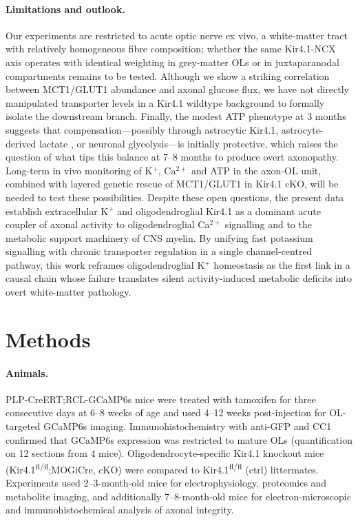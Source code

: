 \documentclass[11pt,a4paper]{article}
\begin{document}
\paragraph{Limitations and outlook.} Our experiments are restricted to acute optic nerve ex vivo, a white-matter tract with relatively homogeneous fibre composition; whether the same Kir4.1-NCX axis operates with identical weighting in grey-matter OLs or in juxtaparanodal compartments remains to be tested. Although we show a striking correlation between MCT1/GLUT1 abundance and axonal glucose flux, we have not directly manipulated transporter levels in a Kir4.1 wildtype background to formally isolate the downstream branch. Finally, the modest ATP phenotype at 3 months suggests that compensation---possibly through astrocytic Kir4.1, astrocyte-derived lactate \citep{Tekkok2005}, or neuronal glycolysis---is initially protective, which raises the question of what tips this balance at 7--8 months to produce overt axonopathy. Long-term in vivo monitoring of K$^+$, Ca$^{2+}$ and ATP in the axon-OL unit, combined with layered genetic rescue of MCT1/GLUT1 in Kir4.1 cKO, will be needed to test these possibilities. Despite these open questions, the present data establish extracellular K$^+$ and oligodendroglial Kir4.1 as a dominant acute coupler of axonal activity to oligodendroglial Ca$^{2+}$ signalling and to the metabolic support machinery of CNS myelin. By unifying fast potassium signalling with chronic transporter regulation in a single channel-centred pathway, this work reframes oligodendroglial K$^+$ homeostasis as the first link in a causal chain whose failure translates silent activity-induced metabolic deficits into overt white-matter pathology.

\section{Methods}

\paragraph{Animals.} PLP-CreERT;RCL-GCaMP6s mice were treated with tamoxifen for three consecutive days at 6--8 weeks of age and used 4--12 weeks post-injection for OL-targeted GCaMP6s imaging. Immunohistochemistry with anti-GFP and CC1 confirmed that GCaMP6s expression was restricted to mature OLs (quantification on 12 sections from 4 mice). Oligodendrocyte-specific Kir4.1 knockout mice (Kir4.1\textsuperscript{fl/fl};MOGiCre, cKO) were compared to Kir4.1\textsuperscript{fl/fl} (ctrl) littermates. Experiments used 2--3-month-old mice for electrophysiology, proteomics and metabolite imaging, and additionally 7--8-month-old mice for electron-microscopic and immunohistochemical analysis of axonal integrity.
\end{document}
